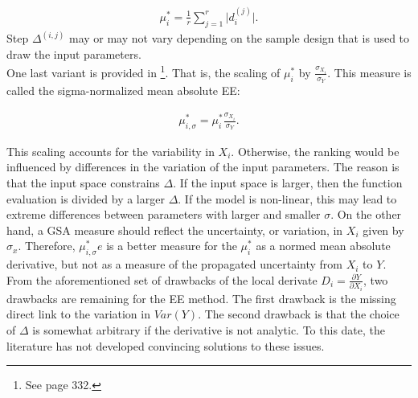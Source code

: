 \documentclass[a4paper,12pt]{article}
\begin{document}
\begin{align}
\mu_i^* = \frac{1}{r} \sum_{j=1}^{r} \big| d_i^{(j)} \big|.
\end{align}
\noindent
Step $\Delta^{(i,j)}$ may or may not vary depending on the sample design that is used to draw the input parameters.\\


\noindent
One last variant is provided in \cite{Smith.2014}\footnote{See page 332.}. That is, the scaling of $\mu_{i}^*$ by $\frac{\sigma_{X_i}}{\sigma_Y}$. This measure is called the sigma-normalized mean absolute EE: 


\begin{align}
\mu_{i,\sigma}^* = \mu_i^* \frac{\sigma_{X_i}}{\sigma_Y}.
\end{align}

\noindent
This scaling accounts for the variability in $X_i$. Otherwise, the ranking would be influenced by differences in the variation of the input parameters. The reason is that the input space constrains $\Delta$. If the input space is larger, then the function evaluation is divided by a larger $\Delta$. If the model is non-linear, this may lead to extreme differences between parameters with larger and smaller $\sigma$. On the other hand, a GSA measure should reflect the uncertainty, or variation, in $X_i$ given by $\sigma_x$. Therefore, $\mu_{i,\sigma}^*e$ is a better measure for the $\mu_{i}^*$ as a normed mean absolute derivative, but not as a measure of the propagated uncertainty from $X_i$ to $Y$. \\


\noindent
From the aforementioned set of drawbacks of the local derivate $D_i = \frac{\partial Y}{\partial X_i}$, two drawbacks are remaining for the EE method. The first drawback is the missing direct link to the variation in $Var(Y)$. The second drawback is that the choice of $\Delta$ is somewhat arbitrary if the derivative is not analytic. To this date, the literature has not developed convincing solutions to these issues.
\end{document}
